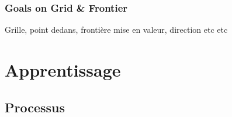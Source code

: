 \documentclass[french]{beamer}
\begin{document}
\begin{frame}
    \frametitle{Goals on Grid \& Frontier}


    Grille, point dedans, frontière mise en valeur, direction etc etc

\end{frame}



\section{Apprentissage}


\subsection{Processus}
\end{document}
